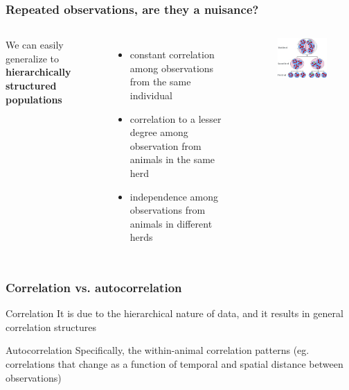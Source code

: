 \documentclass[10pt]{beamer}
\begin{document}
\begin{frame}[fragile]
\frametitle{Repeated observations, are they a nuisance?}

\begin{columns}

We can easily generalize to {\bf hierarchically structured populations}\\
\begin{itemize}
\item constant correlation among observations from the same individual
\item correlation to a lesser degree among observation from animals in the same herd
\item independence among observations from animals in different herds
\end{itemize}

\begin{figure}
\includegraphics[width=0.8\linewidth]{pictures/livelli}
\end{figure}

\end{columns}
\end{frame}



\begin{frame}[fragile]
\frametitle{Correlation vs. autocorrelation}

\begin{block}{Correlation}
It is due to the hierarchical nature of data, and it results in general correlation structures
\end{block}

\begin{block}{Autocorrelation}
Specifically, the within-animal correlation patterns (eg. correlations that change as a function of temporal and spatial distance between observations)
\end{block}


\end{frame}
\end{document}
